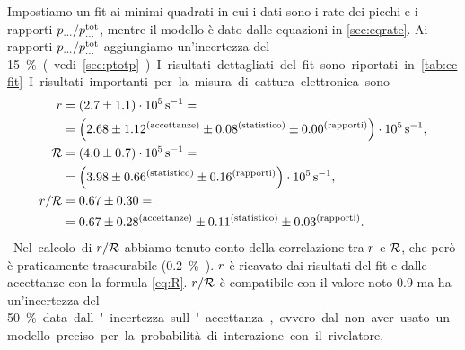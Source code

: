 Impostiamo un fit ai minimi quadrati
in cui i dati sono i rate dei picchi e i rapporti $p_{\dots}/p_{\dots}\tot$,
mentre il modello è dato dalle equazioni in \autoref{sec:eqrate}.
Ai rapporti $p_{\dots}/p_{\dots}\tot$ aggiungiamo un'incertezza del \SI{15}\% (vedi \autoref{sec:ptotp}).
I risultati dettagliati del fit sono riportati in \autoref{tab:ecfit}.
I risultati importanti per la misura di cattura elettronica sono
\begin{align*}
	\R
	&= (2.7 \pm 1.1) \cdot 10^5 \,\si{s^{-1}} = \\
	&= \left(2.68
	\pm 1.12^\text{(accettanze)}
	\pm 0.08^\text{(statistico)}
	\pm 0.00^\text{(rapporti)}\right) \cdot 10^5 \,\si{s^{-1}}, \\
	\Rtot
	&= (4.0 \pm 0.7) \cdot 10^5 \,\si{s^{-1}} = \\
	&= \left(3.98
	\pm 0.66^\text{(statistico)}
	\pm 0.16^\text{(rapporti)}\right) \cdot 10^5 \,\si{s^{-1}}, \\
	\R/\Rtot
	&= 0.67 \pm 0.30 = \\
	&= 0.67 \pm 0.28^\text{(accettanze)} \pm 0.11^\text{(statistico)} \pm 0.03^\text{(rapporti)}.
\end{align*}
Nel calcolo di $\R/\Rtot$ abbiamo tenuto conto della correlazione tra $\R$ e $\Rtot$,
che però è praticamente trascurabile (\SI{0.2}\%).
$\R$ è ricavato dai risultati del fit e dalle accettanze con la formula \eqref{eq:R}.
$\R/\Rtot$ è compatibile con il valore noto 0.9
ma ha un'incertezza del \SI{50}\% data dall'incertezza sull'accettanza,
ovvero dal non aver usato un modello preciso per la probabilità di interazione con il rivelatore.

